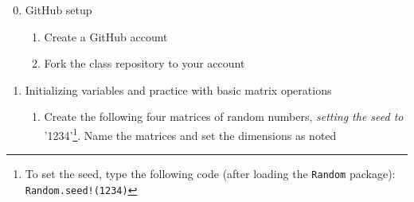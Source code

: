 \documentclass[12pt,english]{article}
\begin{document}
\begin{enumerate}
\setcounter{enumi}{-1}
\item GitHub setup
    \begin{enumerate}
        \item Create a GitHub account
        \item Fork the class repository to your account
    \end{enumerate}


\item Initializing variables and practice with basic matrix operations

\begin{enumerate}
\item Create the following four matrices of random numbers, \emph{setting the seed to} '1234'\footnote{To set the seed, type the following code (after loading the \texttt{Random} package): \texttt{Random.seed!(1234)}}. Name the matrices and set the dimensions as noted


\end{enumerate}
\end{enumerate}
\end{document}
